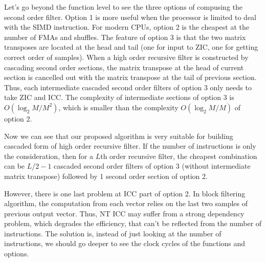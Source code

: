 Let's go beyond the function level to see the three options of compusing the second order filter. Option 1 is more useful when the processor is limited to deal with the SIMD instruction.
For modern CPUs, option 2 is the cheapest at the number of FMAs and shuffles. The feature of option 3 is that the two matrix transposes
are located at the head and tail (one for input to ZIC, one for getting correct order of samples). When a high order recursive filter is constructed by cascading second order sections,
the matrix transpose at the head of current section is cancelled out with the matrix transpose at the tail of previous section. 
Thus, each intermediate cascaded second order filters of option 3 only needs to take ZIC and ICC.
The complexity of intermediate sections of option 3 is $O(\log_2M/M^2)$, which is smaller than the complexity $O(\log_2M/M)$
of option 2.

Now we can see that our proposed algorithm is very suitable for building cascaded form of high order recursive filter.
If the number of instructions is only the consideration, then for a $L$th order recursive filter,
the cheapest combination can be $L/2-1$ cascaded second order filters of option 3 (without intermediate matrix transpose)
followed by 1 second order section of option 2.

However, there is one last problem at ICC part of option 2. In block filtering algorithm, the computation from each vector
relies on the last two samples of previous output vector. Thus, 
NT ICC may suffer from a strong dependency problem, which degrades the efficiency,
that can't be reflected from the number of instructions.
The solution is, instead of just looking at the number of instructions,  
we should go deeper to see the clock cycles of the functions and options.







